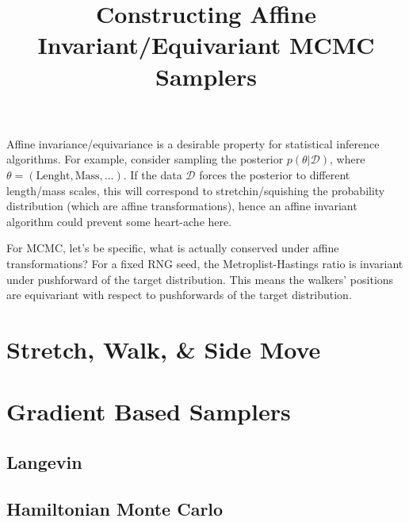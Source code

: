 \documentclass{article}
\title{Constructing Affine Invariant/Equivariant MCMC Samplers}
\date{}
\begin{document}
\maketitle

Affine invariance/equivariance is a desirable property for statistical inference algorithms. For example, consider sampling the posterior $p(\theta | \mathcal D)$, where $\theta = (\text{Lenght}, \text{Mass}, ...)$. If the data $\mathcal D$ forces the posterior to different length/mass scales, this will correspond to stretchin/squishing the probability distribution (which are affine transformations), hence an affine invariant algorithm could prevent some heart-ache here.

For MCMC, let's be specific, what is actually conserved under affine transformations? For a fixed RNG seed, the Metroplist-Hastings ratio is invariant under pushforward of the target distribution. This means the walkers' positions are equivariant with respect to pushforwards of the target distribution.



\section{Stretch, Walk, \& Side Move}

\section{Gradient Based Samplers}


\subsection{Langevin}

\subsection{Hamiltonian Monte Carlo}
\end{document}
